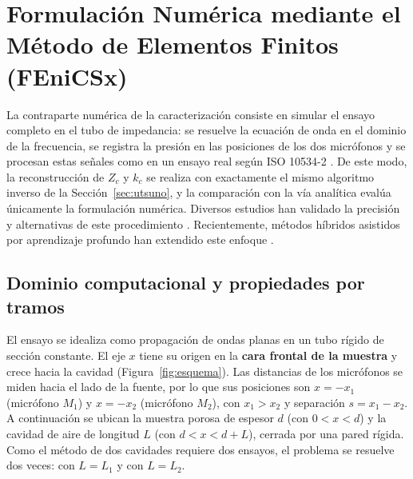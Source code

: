 \documentclass[11pt,a4paper]{article}
\begin{document}
\section{Formulación Numérica mediante el Método de Elementos Finitos (FEniCSx)}
\label{sec:fem}

La contraparte numérica de la caracterización consiste en simular el ensayo completo en el tubo de impedancia: se resuelve la ecuación de onda en el dominio de la frecuencia, se registra la presión en las posiciones de los dos micrófonos y se procesan estas señales como en un ensayo real según ISO 10534-2 \citep{iso10534_2}. De este modo, la reconstrucción de $Z_c$ y $k_c$ se realiza con exactamente el mismo algoritmo inverso de la Sección~\ref{sec:utsuno}, y la comparación con la vía analítica evalúa únicamente la formulación numérica. Diversos estudios han validado la precisión y alternativas de este procedimiento \citep{jones1997, dupont2013, oliveira2016, aygun2017}. Recientemente, métodos híbridos asistidos por aprendizaje profundo han extendido este enfoque \citep{eser2025}.

\subsection{Dominio computacional y propiedades por tramos}
El ensayo se idealiza como propagación de ondas planas en un tubo rígido de sección constante. El eje $x$ tiene su origen en la \textbf{cara frontal de la muestra} y crece hacia la cavidad (Figura~\ref{fig:esquema}). Las distancias de los micrófonos se miden hacia el lado de la fuente, por lo que sus posiciones son $x=-x_1$ (micrófono $M_1$) y $x=-x_2$ (micrófono $M_2$), con $x_1>x_2$ y separación $s=x_1-x_2$. A continuación se ubican la muestra porosa de espesor $d$ (con $0<x<d$) y la cavidad de aire de longitud $L$ (con $d<x<d+L$), cerrada por una pared rígida. Como el método de dos cavidades requiere dos ensayos, el problema se resuelve dos veces: con $L=L_1$ y con $L=L_2$.
\end{document}
